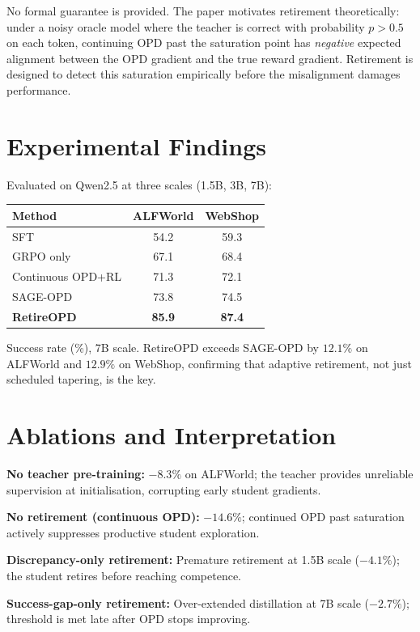 \documentclass[10pt,twocolumn]{article}
\begin{document}
No formal guarantee is provided. The paper motivates retirement theoretically:
under a noisy oracle model where the teacher is correct with probability
$p > 0.5$ on each token, continuing OPD past the saturation point has
\emph{negative} expected alignment between the OPD gradient and the true
reward gradient. Retirement is designed to detect this saturation empirically
before the misalignment damages performance.

\section{Experimental Findings}

Evaluated on Qwen2.5 at three scales (1.5B, 3B, 7B):

\begin{center}
\small
\begin{tabular}{lcc}
\toprule
Method & ALFWorld & WebShop \\
\midrule
SFT & 54.2 & 59.3 \\
GRPO only & 67.1 & 68.4 \\
Continuous OPD+RL & 71.3 & 72.1 \\
SAGE-OPD & 73.8 & 74.5 \\
\textbf{RetireOPD} & \textbf{85.9} & \textbf{87.4} \\
\bottomrule
\end{tabular}
\end{center}

Success rate (\%), 7B scale. RetireOPD exceeds SAGE-OPD by
$12.1\%$ on ALFWorld and $12.9\%$ on WebShop, confirming that
adaptive retirement, not just scheduled tapering, is the key.

\section{Ablations and Interpretation}

\textbf{No teacher pre-training:} $-8.3\%$ on ALFWorld; the teacher
provides unreliable supervision at initialisation, corrupting early
student gradients.

\textbf{No retirement (continuous OPD):} $-14.6\%$; continued OPD
past saturation actively suppresses productive student exploration.

\textbf{Discrepancy-only retirement:} Premature retirement at 1.5B
scale ($-4.1\%$); the student retires before reaching competence.

\textbf{Success-gap-only retirement:} Over-extended distillation at
7B scale ($-2.7\%$); threshold is met late after OPD stops improving.
\end{document}
